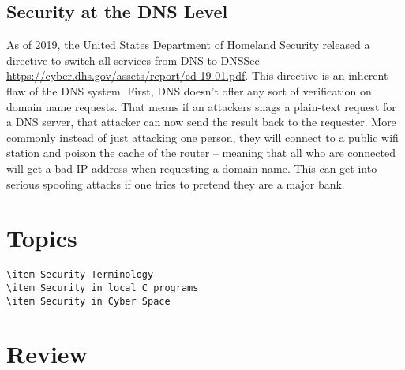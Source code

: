 \subsection{Security at the DNS Level}

As of 2019, the United States Department of Homeland Security released a directive to switch all services from DNS to DNSSec \url{https://cyber.dhs.gov/assets/report/ed-19-01.pdf}.
This directive is an inherent flaw of the DNS system.
First, DNS doesn't offer any sort of verification on domain name requests.
That means if an attackers snags a plain-text request for a DNS server, that attacker can now send the result back to the requester.
More commonly instead of just attacking one person, they will connect to a public wifi station and poison the cache of the router -- meaning that all who are connected will get a bad IP address when requesting a domain name.
This can get into serious spoofing attacks if one tries to pretend they are a major bank.

\section{Topics}

\begin{lstlisting}
\item Security Terminology
\item Security in local C programs
\item Security in Cyber Space
\end{lstlisting}

\section{Review}

